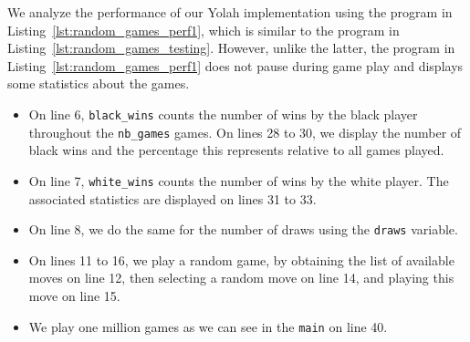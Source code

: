 \documentclass[12pt,a4paper,twoside,openright]{book}
\begin{document}
We analyze the performance of our Yolah implementation using the program in Listing~\ref{lst:random_games_perf1}, which is similar to the program in Listing~\ref{lst:random_games_testing}. However, unlike the latter, the program in Listing~\ref{lst:random_games_perf1} does not pause during game play and displays some statistics about the games.
\begin{itemize}
\item On line 6, \texttt{black_wins} counts the number of wins by the black player throughout the \texttt{nb_games} games. On lines 28 to 30, we display the number of black wins and the percentage this represents relative to all games played.
\item On line 7, \texttt{white_wins} counts the number of wins by the white player. The associated statistics are displayed on lines 31 to 33.
\item On line 8, we do the same for the number of draws using the \texttt{draws} variable.
\item On lines 11 to 16, we play a random game, by obtaining the list of available moves on line 12, then selecting a random move on line 14, and playing this move on line 15.
\item We play one million games as we can see in the \texttt{main} on line 40.
\end{itemize}
\end{document}

